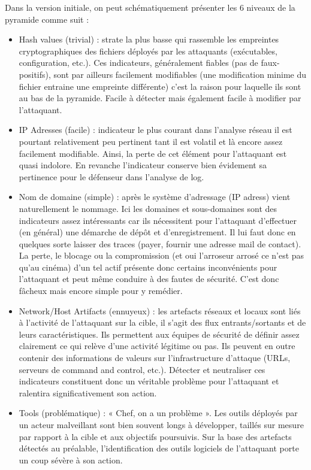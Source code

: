 \documentclass[a4paper]{article}
\begin{document}
Dans la version initiale, on peut schématiquement présenter les 6 niveaux de la pyramide comme suit :
\begin{itemize}
\item Hash values (trivial) : strate la plus basse qui rassemble les empreintes cryptographiques des fichiers déployés par les attaquants (exécutables, configuration, etc.). Ces indicateurs, généralement fiables (pas de faux-positifs), sont par ailleurs facilement modifiables (une modification minime du fichier entraine une empreinte différente) c’est la raison pour laquelle ils sont au bas de la pyramide. Facile à détecter mais également facile à modifier par l’attaquant.

\item IP Adresses (facile) : indicateur le plus courant dans l’analyse réseau il est pourtant relativement peu pertinent tant il est volatil et là encore assez facilement modifiable. Ainsi, la perte de cet élément pour l’attaquant est quasi indolore. En revanche l’indicateur conserve bien évidement sa pertinence pour le défenseur dans l’analyse de log.

\item Nom de domaine (simple) : après le système d’adressage (IP adress) vient naturellement le nommage. Ici les domaines et sous-domaines sont des indicateurs assez intéressants car ils nécessitent pour l’attaquant d’effectuer (en général) une démarche de dépôt et d’enregistrement. Il lui faut donc en quelques sorte laisser des traces (payer, fournir une adresse mail de contact). La perte, le blocage ou la compromission (et oui l’arroseur arrosé ce n’est pas qu’au cinéma) d’un tel actif présente donc certains inconvénients pour l’attaquant et peut même conduire à des fautes de sécurité. C’est donc fâcheux mais encore simple pour y remédier. 

\item Network/Host Artifacts (ennuyeux) : les artefacts réseaux et locaux sont liés à l’activité de l’attaquant sur la cible, il s’agit des flux entrants/sortants et de leurs caractéristiques. Ils permettent aux équipes de sécurité de définir assez clairement ce qui relève d’une activité légitime ou pas. Ils peuvent en outre contenir des informations de valeurs sur l’infrastructure d’attaque (URLs, serveurs de command and control, etc.). Détecter et neutraliser ces indicateurs constituent donc un véritable problème pour l’attaquant et ralentira significativement son action.

\item Tools (problématique) : « Chef, on a un problème ». Les outils déployés par un acteur malveillant sont bien souvent longs à développer, taillés sur mesure par rapport à la cible et aux objectifs poursuivis. Sur la base des artefacts détectés au préalable, l’identification des outils logiciels de l’attaquant porte un coup sévère à son action.


\end{itemize}
\end{document}
